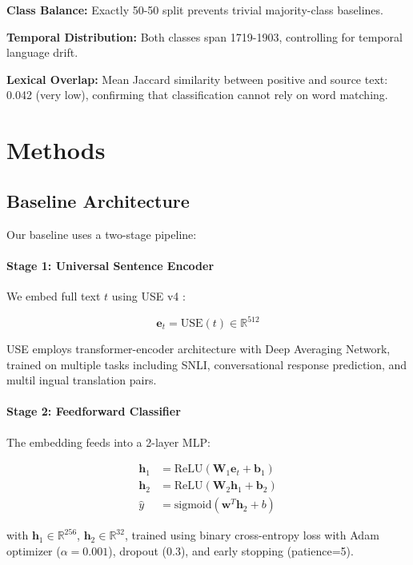 \documentclass[11pt,a4paper]{article}
\begin{document}
\textbf{Class Balance:} Exactly 50-50 split prevents trivial majority-class baselines.

\textbf{Temporal Distribution:} Both classes span 1719-1903, controlling for temporal language drift.

\textbf{Lexical Overlap:} Mean Jaccard similarity between positive and source text: 0.042 (very low), confirming that classification cannot rely on word matching.

\section{Methods}

\subsection{Baseline Architecture}

Our baseline uses a two-stage pipeline:

\paragraph{Stage 1: Universal Sentence Encoder}
We embed full text $t$ using USE v4 \cite{Cer2018}:

\begin{equation}
\mathbf{e}_t = \text{USE}(t) \in \mathbb{R}^{512}
\end{equation}

USE employs transformer-encoder architecture with Deep Averaging Network, trained on multiple tasks including SNLI, conversational response prediction, and multil ingual translation pairs.

\paragraph{Stage 2: Feedforward Classifier}
The embedding feeds into a 2-layer MLP:

\begin{equation}
\begin{aligned}
\mathbf{h}_1 &= \text{ReLU}(\mathbf{W}_1 \mathbf{e}_t + \mathbf{b}_1) \\
\mathbf{h}_2 &= \text{ReLU}(\mathbf{W}_2 \mathbf{h}_1 + \mathbf{b}_2) \\
\hat{y} &= \text{sigmoid}(\mathbf{w}^T \mathbf{h}_2 + b)
\end{aligned}
\end{equation}

with $\mathbf{h}_1 \in \mathbb{R}^{256}$, $\mathbf{h}_2 \in \mathbb{R}^{32}$, trained using binary cross-entropy loss with Adam optimizer ($\alpha=0.001$), dropout (0.3), and early stopping (patience=5).
\end{document}
